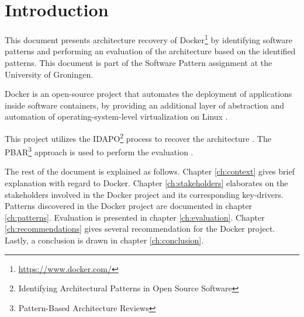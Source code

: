 \clearpage
\chapter{Introduction}
\label{ch:introduction}
This document presents architecture recovery of Docker\footnote{\url{https://www.docker.com/}} by identifying software patterns and performing an evaluation of the architecture based on the identified patterns. This document is part of the Software Pattern assignment at the University of Groningen.

Docker is an open-source project that automates the deployment of applications inside software containers, by providing an additional layer of abstraction and automation of operating-system-level virtualization on Linux \cite{dockerdef}.

This project utilizes the IDAPO\footnote{Identifying Architectural Patterns in Open Source Software} process to recover the architecture \cite{idapo}. The PBAR\footnote{Pattern-Based Architecture Reviews} approach is used to perform the evaluation \cite{pbar}.




The rest of the document is explained as follows. Chapter \ref{ch:context} gives brief explanation with regard to Docker. Chapter \ref{ch:stakeholders} elaborates on the stakeholders involved in the Docker project and its corresponding key-drivers. Patterns discovered in the Docker project are documented in chapter \ref{ch:patterns}. Evaluation is presented in chapter \ref{ch:evaluation}. Chapter \ref{ch:recommendations} gives several recommendation for the Docker project. Lastly, a conclusion is drawn in chapter \ref{ch:conclusion}.